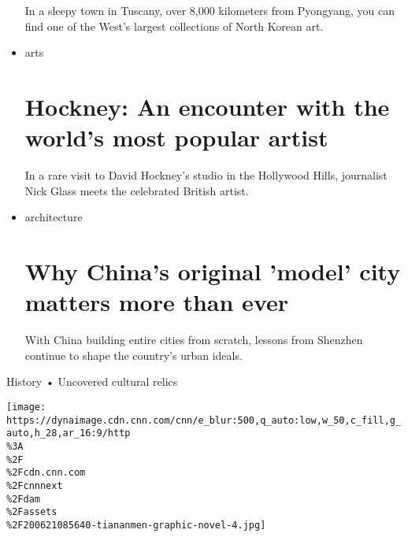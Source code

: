 \begin{itemize}
  \href{/style/article/north-korea-art-dealer-pier-luigi-cecioni/index.html}{}

  In a sleepy town in Tuscany, over 8,000 kilometers from Pyongyang, you
  can find one of the West's largest collections of North Korean art.
\item
  \href{/style/arts}{}

  arts

  \href{/style/article/david-hockney-at-80-interview-los-angeles/index.html}{}

  \hypertarget{hockney-an-encounter-with-the-worlds-most-popular-artist}{%
  \section{Hockney: An encounter with the world's most popular
  artist}\label{hockney-an-encounter-with-the-worlds-most-popular-artist}}

  \href{/style/article/david-hockney-at-80-interview-los-angeles/index.html}{}

  In a rare visit to David Hockney's studio in the Hollywood Hills,
  journalist Nick Glass meets the celebrated British artist.
\item
  \href{/style/architecture}{}

  architecture

  \href{/style/article/shenzhen-effect-china-model-city-intl-hnk/index.html}{}

  \hypertarget{why-chinas-original-model-city-matters-more-than-ever}{%
  \section{Why China's original 'model' city matters more than
  ever}\label{why-chinas-original-model-city-matters-more-than-ever}}

  \href{/style/article/shenzhen-effect-china-model-city-intl-hnk/index.html}{}

  With China building entire cities from scratch, lessons from Shenzhen
  continue to shape the country's urban ideals.
\end{itemize}

History • Uncovered cultural relics

\href{/style/article/tiananmen-square-massacre-graphic-novel-comics-journalism-intl-hnk/index.html}{}

\texttt{[image: https://dynaimage.cdn.cnn.com/cnn/e\_blur:500,q\_auto:low,w\_50,c\_fill,g\_auto,h\_28,ar\_16:9/http\\\%3A\\\%2F\\\%2Fcdn.cnn.com\\\%2Fcnnnext\\\%2Fdam\\\%2Fassets\\\%2F200621085640-tiananmen-graphic-novel-4.jpg]}


